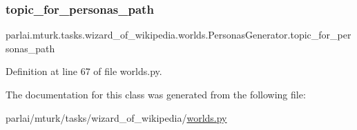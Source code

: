 \subsubsection{\texorpdfstring{topic\+\_\+for\+\_\+personas\+\_\+path}{topic\_for\_personas\_path}}
{\footnotesize\ttfamily parlai.\+mturk.\+tasks.\+wizard\+\_\+of\+\_\+wikipedia.\+worlds.\+Personas\+Generator.\+topic\+\_\+for\+\_\+personas\+\_\+path}



Definition at line 67 of file worlds.\+py.



The documentation for this class was generated from the following file\+:\begin{DoxyCompactItemize}
\item 
parlai/mturk/tasks/wizard\+\_\+of\+\_\+wikipedia/\hyperlink{parlai_2mturk_2tasks_2wizard__of__wikipedia_2worlds_8py}{worlds.\+py}\end{DoxyCompactItemize}

